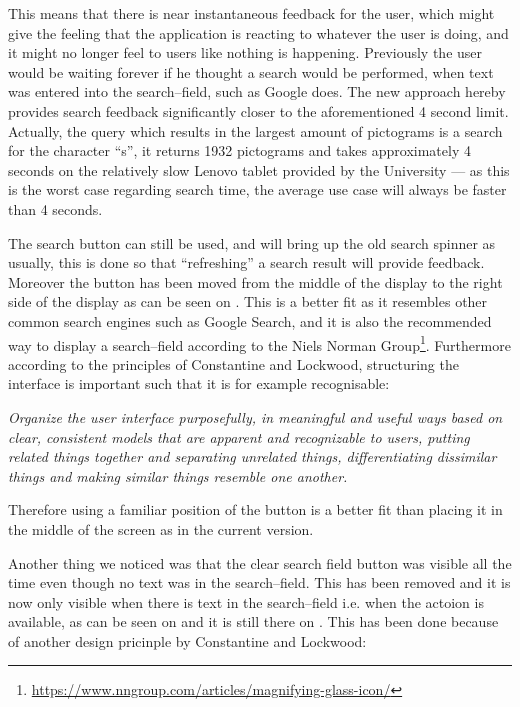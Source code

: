 This means that there is near instantaneous feedback for the user, which might give the feeling that the application is reacting to whatever the user is doing, and it might no longer feel to users like nothing is happening.
Previously the user would be waiting forever if he thought a search would be performed, when text was entered into the search--field, such as Google does.
The new approach hereby provides search feedback significantly closer to the aforementioned 4 second limit.
Actually, the query which results in the largest amount of pictograms is a search for the character \enquote{s}, it returns 1932 pictograms and takes approximately 4 seconds on the relatively slow Lenovo tablet provided by the University --- as this is the worst case regarding search time, the average use case will always be faster than 4 seconds.

The search button can still be used, and will bring up the old search spinner as usually, this is done so that \enquote{refreshing} a search result will provide feedback.
Moreover the button has been moved from the middle of the display to the right side of the display as can be seen on .
This is a better fit as it resembles other common search engines such as Google Search, and it is also the recommended way to display a search--field according to the Niels Norman Group\footnote{\url{https://www.nngroup.com/articles/magnifying-glass-icon/}}.
Furthermore according to the principles of Constantine and Lockwood, structuring the interface is important such that it is for example recognisable:

\newpage
\begin{displayquote}
\textit{Organize the user interface purposefully, in meaningful and useful ways based on clear, consistent models that are apparent and recognizable to users, putting related things together and separating unrelated things, differentiating dissimilar things and making similar things resemble one
another.}\cite[p.~51]{DESIGNBOOK}
\end{displayquote}    

\noindent
Therefore using a familiar position of the button is a better fit than placing it in the middle of the screen as in the current version.

Another thing we noticed was that the clear search field button was visible all the time even though no text was in the search--field.
This has been removed and it is now only visible when there is text in the search--field i.e. when the actoion is available, as can be seen on  and it is still there on .
This has been done because of another design pricinple by Constantine and Lockwood:

